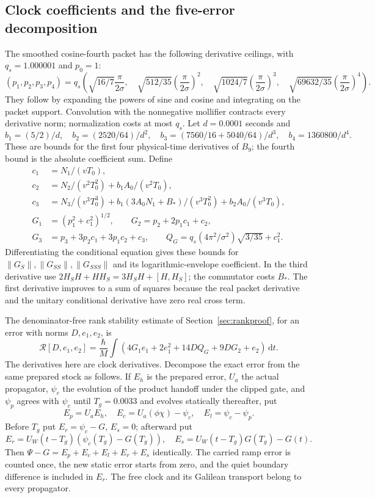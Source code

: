 \documentclass[11pt]{article}
\theoremstyle{definition}\newtheorem{definition}[theorem]{Definition}
\theoremstyle{remark}\newtheorem{remark}[theorem]{Remark}
\newcommand{\dd}{\,\mathrm d}\newcommand{\Imv}{\operatorname{Im}}\newcommand{\ii}{\mathrm i}
\begin{document}
\subsection{Clock coefficients and the five-error decomposition}
\label{old:clockcoeff}
The smoothed cosine-fourth packet has the following derivative ceilings,
with $q_s=1.000001$ and $p_0=1$:
\[
 (p_1,p_2,p_3,p_4)=q_s\left(
 \sqrt{16/7}\frac\pi{2\sigma},\quad
 \sqrt{512/35}\left(\frac\pi{2\sigma}\right)^2,\quad
 \sqrt{1024/7}\left(\frac\pi{2\sigma}\right)^3,\quad
 \sqrt{69632/35}\left(\frac\pi{2\sigma}\right)^4\right).
\]
They follow by expanding the powers of sine and cosine and integrating
on the packet support. Convolution with the nonnegative mollifier
contracts every derivative norm; normalization costs at most $q_s$.
Let $d=0.0001$ seconds and
\[
 b_1=(5/2)/d,\quad b_2=(2520/64)/d^2,\quad
 b_3=(7560/16+5040/64)/d^3,\quad b_4=1360800/d^4.
\]
These are bounds for the first four physical-time derivatives of $B_9$;
the fourth bound is the absolute coefficient sum. Define
\begin{align*}
 c_1&=N_1/(vT_0),\\
 c_2&=N_2/(v^2T_0^2)+b_1A_0/(v^2T_0),\\
 c_3&=N_3/(v^3T_0^3)+b_1(3A_0N_1+B_*)/(v^3T_0^2)
                                      +b_2A_0/(v^3T_0),\\
 G_1&=(p_1^2+c_1^2)^{1/2},\qquad
 G_2=p_2+2p_1c_1+c_2,\\
 G_3&=p_3+3p_2c_1+3p_1c_2+c_3,\qquad
 Q_G=q_s(4\pi^2/\sigma^2)\sqrt{3/35}+c_1^2.
\end{align*}
Differentiating the conditional equation gives these bounds for
$\|G_S\|,\|G_{SS}\|,\|G_{SSS}\|$ and its logarithmic-envelope
coefficient. In the third derivative use
$2H_SH+HH_S=3H_SH+[H,H_S]$; the commutator costs $B_*$.
The first derivative improves to a sum of squares because the real
packet derivative and the unitary conditional derivative have zero real
cross term.

The denominator-free rank stability estimate of
Section~\ref{sec:rankproof}, for an error with norms $D,e_1,e_2$, is
\begin{equation}
 \mathcal R[D,e_1,e_2]=\frac\hbar M\int
 (4G_1e_1+2e_1^2+14DQ_G+9DG_2+e_2)\dd t.
 \label{old:Rfunctional}
\end{equation}
The derivatives here are clock derivatives. Decompose the exact error
from the same prepared stock as follows. If $E_h$ is the prepared error,
$U_a$ the actual propagator, $\psi_c$ the evolution of the product handoff
under the clipped gate, and $\psi_p$ agrees with $\psi_c$ until
$T_g=0.0033$ and evolves statically thereafter, put
\[
 E_p=U_aE_h,\quad E_c=U_a(\phi\chi)-\psi_c,\quad
 E_l=\psi_c-\psi_p.
\]
Before $T_g$ put $E_r=\psi_c-G$, $E_s=0$; afterward put
\[
 E_r=U_W(t-T_g)(\psi_c(T_g)-G(T_g)),\quad
 E_s=U_W(t-T_g)G(T_g)-G(t).
\]
Then $\Psi-G=E_p+E_c+E_l+E_r+E_s$ identically.
The carried ramp error is counted once, the new static error starts
from zero, and the quiet boundary difference is included in $E_r$.
The free clock and its Galilean transport belong to every propagator.
\end{document}
